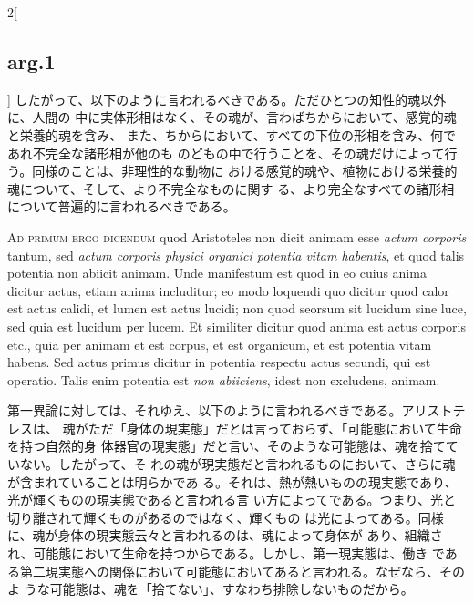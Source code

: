 \documentclass[paper=a4paper,fontsize=10pt,jafontsize=9pt,titlepage]{jlreq}
\begin{document}
\begin{paracol}{2}[\subsection{arg.1}]
 したがって、以下のように言われるべきである。ただひとつの知性的魂以外に、人間の
 中に実体形相はなく、その魂が、言わばちからにおいて、感覚的魂と栄養的魂を含み、
 また、ちからにおいて、すべての下位の形相を含み、何であれ不完全な諸形相が他のも
 のどもの中で行うことを、その魂だけによって行う。同様のことは、非理性的な動物に
 おける感覚的魂や、植物における栄養的魂について、そして、より不完全なものに関す
 る、より完全なすべての諸形相について普遍的に言われるべきである。
 
\switchcolumn*[\subsection{ad 1}]


{\scshape Ad primum ergo dicendum} quod Aristoteles non dicit animam esse
{\itshape actum corporis} tantum, sed {\itshape actum corporis physici organici
potentia vitam habentis}, et quod talis potentia non abiicit animam. Unde
manifestum est quod in eo cuius anima dicitur actus, etiam anima includitur; eo
modo loquendi quo dicitur quod calor est actus calidi, et lumen est actus
lucidi; non quod seorsum sit lucidum sine luce, sed quia est lucidum per
lucem. Et similiter dicitur quod anima est actus corporis etc., quia per animam
et est corpus, et est organicum, et est potentia vitam habens. Sed actus primus
dicitur in potentia respectu actus secundi, qui est operatio. Talis enim
potentia est {\itshape non abiiciens}, idest non excludens, animam.

\switchcolumn

 第一異論に対しては、それゆえ、以下のように言われるべきである。アリストテレスは、
 魂がただ「身体の現実態」だとは言っておらず、「可能態において生命を持つ自然的身
 体器官の現実態」だと言い、そのような可能態は、魂を捨てていない。したがって、そ
 れの魂が現実態だと言われるものにおいて、さらに魂が含まれていることは明らかであ
 る。それは、熱が熱いものの現実態であり、光が輝くものの現実態であると言われる言
 い方によってである。つまり、光と切り離されて輝くものがあるのではなく、輝くもの
 は光によってある。同様に、魂が身体の現実態云々と言われるのは、魂によって身体が
 あり、組織され、可能態において生命を持つからである。しかし、第一現実態は、働き
 である第二現実態への関係において可能態においてあると言われる。なぜなら、そのよ
 うな可能態は、魂を「捨てない」、すなわち排除しないものだから。
 
 
\switchcolumn*[\subsection{ad 2}]



\end{paracol}
\end{document}
